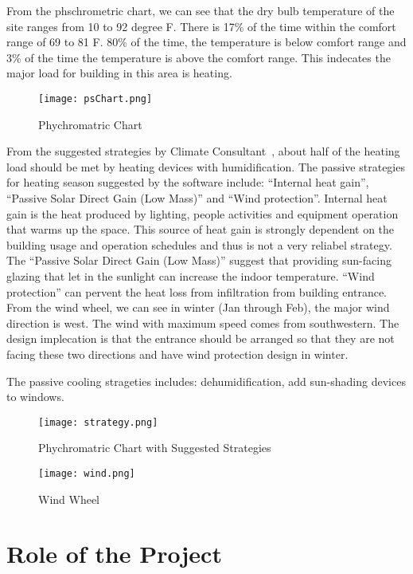From the phschrometric chart, we can see that the dry bulb temperature of the site ranges from 10 to 92 degree F. There is 17\% of the time within the comfort range of 69 to 81 F. 80\% of the time, the temperature is below comfort range and 3\% of the time the temperature is above the comfort range. This indecates the major load for building in this area is heating. 
\begin{figure}[htbp]
  \centering
  \texttt{[image: psChart.png]}
  \caption[Phychromatric Chart]{Phychromatric Chart~\cite{climateConsult}}
  \label{fig:psChart}
\end{figure}
From the suggested strategies by Climate Consultant~\cite{climateConsult}, about half of the heating load should be met by heating devices with humidification. The passive strategies for heating season suggested by the software include: ``Internal heat gain'', ``Passive Solar Direct Gain (Low Mass)'' and ``Wind protection''. Internal heat gain is the heat produced by lighting, people activities and equipment operation that warms up the space. This source of heat gain is strongly dependent on the building usage and operation schedules and thus is not a very reliabel strategy. The  ``Passive Solar Direct Gain (Low Mass)'' suggest that providing sun-facing glazing that let in the sunlight can increase the indoor temperature. ``Wind protection'' can pervent the heat loss from infiltration from building entrance. From the wind wheel, we can see in winter (Jan through Feb), the major wind direction is west. The wind with maximum speed comes from southwestern. The design implecation is that the entrance should be arranged so that they are not facing these two directions and have wind protection design in winter.

The passive cooling strageties includes: dehumidification, add sun-shading devices to windows.
\begin{figure}[htbp]
  \centering
  \texttt{[image: strategy.png]}
  \caption[Phychromatric Chart with Suggested Strategies]{Phychromatric Chart with Suggested Strategies~\cite{climateConsult}}
  \label{fig:strategy}
\end{figure}

\begin{figure}[htbp]
  \centering
  \texttt{[image: wind.png]}
  \caption[Wind Wheel]{Wind Wheel~\cite{climateConsult}}
  \label{fig:wind}
\end{figure}
\section{Role of the Project}
